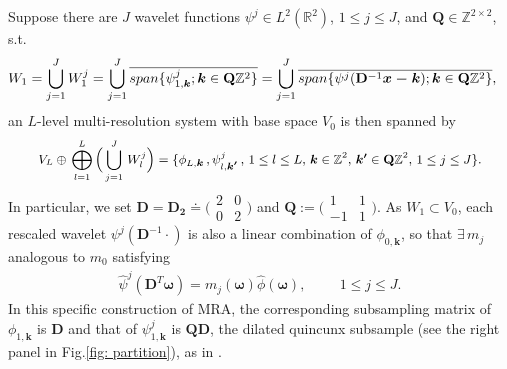 Suppose there are $J$ wavelet functions $\psi^j\in L^2(\mathbb{R}^2)$, {\small $1 \leq j \leq J$}, and $\mathbf{Q}\in\mathbb{Z}^{2\times2}$, s.t.
\begin{align*}
\hspace{-1em} W_1 = \bigcup_{j=1}^J W_1^j = \bigcup_{j=1}^J \overline{span\{\psi^j_{1,\boldsymbol{k}};\boldsymbol{ k}\in \mathbf{Q}\mathbb{Z}^2\}}= \bigcup_{j=1}^J \overline{span\{\psi^j(\mathbf{D}^{-1}\boldsymbol{x-k});\boldsymbol{ k}\in \mathbf{Q}\mathbb{Z}^2\}},
\end{align*}
 an $L$-level multi-resolution system with base space $V_0$ is then spanned by
 \begin{align}\label{eq: MRA}
 V_L\oplus\,\bigoplus_{l=1}^L\Big(\bigcup_{j=1}^J\, W_l^j\Big) =
 \{\phi_{L,\boldsymbol{k}}\,,\psi^j_{l,\boldsymbol{k'}}\,, \, {\small 1\leq l \leq L,\, \boldsymbol{k}\in \mathbb{Z}^2,\,\boldsymbol{k'}\in \mathbf{Q}\mathbb{Z}^2,\,1\leq j \leq J\}}.
\end{align}  
In particular, we set $\mathbf{D} = \mathbf{D_2}\doteq\bigl(\begin{smallmatrix} 2&0\\0&2\end{smallmatrix}\bigr)$ and $\mathbf{Q}:=\bigl(\begin{smallmatrix} 1&1\\-1&1\end{smallmatrix}\bigr)$.
As $W_1\subset V_0$, each rescaled wavelet $\psi^j(\mathbf{D}^{-1}\cdot)$ is also a linear combination of $\phi_{0,\boldsymbol{k}}$, so that $\exists\, m_j$ analogous to $m_0$
satisfying 
\begin{align}\label{eq: mj}
\widehat{\psi}^j(\mathbf{D}^T\boldsymbol{\omega}) = m_j(\boldsymbol{\omega})\widehat{\phi}(\boldsymbol{\omega}),\hspace{1cm} 1\leq j \leq J.
\end{align}
In this specific construction of MRA,
 the corresponding subsampling matrix of $\phi_{1,\boldsymbol{k}}$ is $\mathbf{D}$ and that of $\psi^j_{1,\boldsymbol{k}}$ is $\mathbf{QD}$, the dilated quincunx subsample (see the right panel in Fig.\ref{fig: partition}), as in \cite{durand2007}. 


